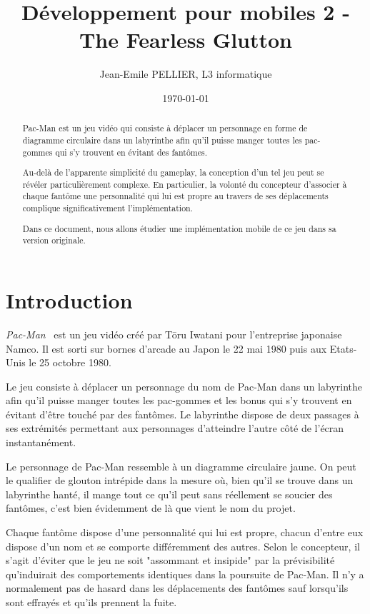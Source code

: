 \documentclass{article}
\title{Développement pour mobiles 2 - The Fearless Glutton}
\author{Jean-Emile PELLIER, L3 informatique}
\date{\today}
\begin{document}
\maketitle %


\begin{abstract}
Pac-Man est un jeu vidéo qui consiste à déplacer un personnage en forme de diagramme circulaire dans un labyrinthe afin qu'il puisse manger toutes les pac-gommes qui s’y trouvent en évitant des fantômes.

Au-delà de l’apparente simplicité du gameplay, la conception d’un tel jeu peut se révéler particulièrement complexe. En particulier, la volonté du concepteur d’associer à chaque fantôme une personnalité qui lui est propre au travers de ses déplacements complique significativement l’implémentation.

Dans ce document, nous allons étudier une implémentation mobile de ce jeu dans sa version originale.
\end{abstract}


\section{Introduction}
\label{section:intro} %

\textit{Pac-Man}~\cite{Pac-Man} est un jeu vidéo créé par T\={o}ru Iwatani pour l’entreprise japonaise Namco. Il est sorti sur bornes d’arcade au Japon le 22 mai 1980 puis aux Etats-Unis le 25 octobre 1980.

Le jeu consiste à déplacer un personnage du nom de Pac-Man dans un labyrinthe afin qu'il puisse manger toutes les pac-gommes et les bonus qui s’y trouvent en évitant d’être touché par des fantômes. Le labyrinthe dispose de deux passages à ses extrémités permettant aux personnages d’atteindre l’autre côté de l’écran instantanément.

Le personnage de Pac-Man ressemble à un diagramme circulaire jaune. On peut le qualifier de glouton intrépide dans la mesure où, bien qu’il se trouve dans un labyrinthe hanté, il mange tout ce qu’il peut sans réellement se soucier des fantômes, c’est bien évidemment de là que vient le nom du projet.

Chaque fantôme dispose d’une personnalité qui lui est propre, chacun d’entre eux dispose d’un nom et se comporte différemment des autres. Selon le concepteur, il s’agit d’éviter que le jeu ne soit "assommant et insipide" par la prévisibilité qu’induirait des comportements identiques dans la poursuite de Pac-Man. Il n’y a normalement pas de hasard dans les déplacements des fantômes sauf lorsqu’ils sont effrayés et qu’ils prennent la fuite.
\end{document}
